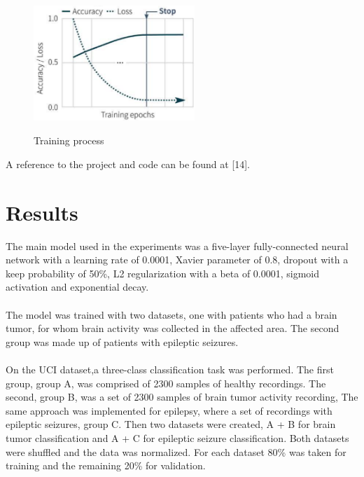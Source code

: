 \documentclass{llncs}       %
\begin{document}
\paragraph{}

\begin{figure}[h]
\centering
\includegraphics[width=6.08cm,height=5.11cm]{media/training-pro.eps}
\caption{ Training process}
\end{figure}

 A reference to the project and code can be found at [14]. 
\paragraph{}\paragraph{}

\paragraph{}
\section{Results}
\label{sec:4}
 The main model used in the experiments was a five-layer fully-connected neural network with a learning rate of 0.0001, Xavier parameter of 0.8, dropout with a keep probability of 50\%, L2 regularization with a beta of 0.0001, sigmoid activation and exponential decay. 

\paragraph{}
The model was trained with two datasets, one with patients who had a brain tumor, for whom brain activity was collected in the affected area. The second group was made up of  patients with epileptic seizures.
\paragraph{}
On the UCI dataset,a three-class classification task was performed. The first group, group A, was comprised of  2300 samples of healthy recordings. The second, group B, was a set of 2300 samples of brain tumor activity recording, The same approach was implemented for epilepsy,  where a set of recordings with epileptic seizures, group  C. Then two datasets were created, A + B for brain tumor classification and A + C for epileptic seizure classification. Both datasets were shuffled and the data was normalized. For each dataset 80\% was taken for training and the remaining 20\% for validation. 
\end{document}
